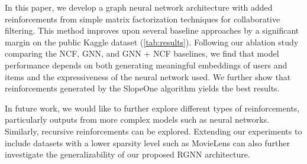 In this paper, we develop a graph neural network architecture with added reinforcements from simple matrix factorization techniques for collaborative filtering. This method improves upon several baseline approaches by a significant margin on the public Kaggle dataset (\autoref{tab:results}). 
Following our ablation study comparing the NCF, GNN, and GNN + NCF baselines, we find that model performance depends on both generating meaningful embeddings of users and items and the expressiveness of the neural network used.
We further show that reinforcements generated by the SlopeOne algorithm \citep{lemire2005slope} yields the best results.

In future work, we would like to further explore different types of reinforcements, particularly outputs from more complex models such as neural networks. Similarly, recursive reinforcements can be explored. Extending our experiments to include datasets with a lower sparsity level such as MovieLens can also further investigate the generalizability of our proposed RGNN architecture.
